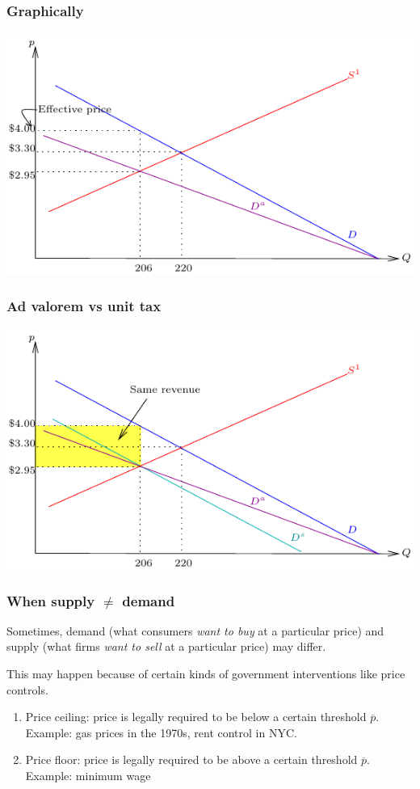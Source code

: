 \documentclass[xcolor=pdftex,dvipsnames]{beamer}
\begin{document}
\begin{frame}
\frametitle{Graphically}
\begin{center}
\includegraphics{pics/DemandTax2}
\end{center}
\end{frame}
\begin{frame}
\frametitle{Ad valorem vs unit tax}
\begin{center}
\includegraphics{pics/DemandTax3}
\end{center}
\end{frame}

\begin{frame}
\frametitle{When supply $\neq$ demand}
Sometimes, demand (what consumers \emph{want to
  buy} at a particular price) and supply (what firms \emph{want to
  sell} at a particular price) may differ.
\bigskip

This may happen because of certain kinds of government interventions
like price controls.

\begin{enumerate}
\item Price ceiling: price is legally required to be below a certain 
  threshold  $\overline p$. Example: gas prices in the 1970s, rent
  control in NYC.
\item Price floor: price is legally required to be above a certain 
  threshold  $\overline p$. Example: minimum wage
\end{enumerate}
\end{frame}
\end{document}
